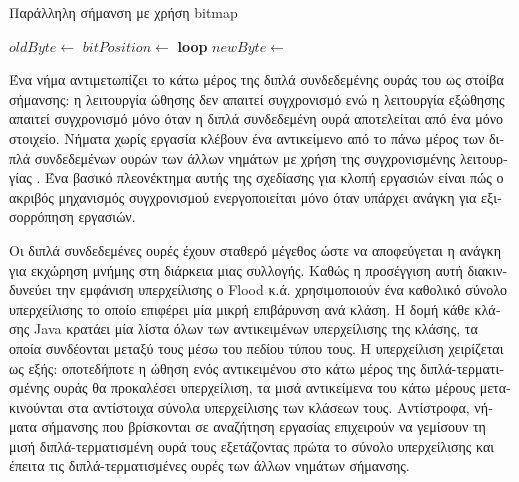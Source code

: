 \begin{greek}
\begin{algorithm}
  \caption{Παράλληλη σήμανση με χρήση bitmap}
  \label{alg:par2}
  \begin{algorithmic}[1]
      \State $oldByte \gets$ 
      \State $bitPosition \gets$ 
      \State \textbf{loop}
      \Loop
          \State \Return{\null}
        \EndIf
        \State $newByte \gets$ 
          \State \Return{\null}
        \EndIf
      \EndLoop
    \EndProcedure
  \end{algorithmic}
\end{algorithm}

Ένα νήμα αντιμετωπίζει το κάτω μέρος της διπλά συνδεδεμένης ουράς
του ως στοίβα σήμανσης: η λειτουργία ώθησης δεν απαιτεί συγχρονισμό
ενώ η λειτουργία εξώθησης απαιτεί συγχρονισμό μόνο όταν η διπλά
συνδεδεμένη ουρά αποτελείται από ένα μόνο στοιχείο. Νήματα χωρίς
εργασία κλέβουν ένα αντικείμενο από το πάνω μέρος των διπλά συνδεδεμένων
ουρών των άλλων νημάτων με χρήση της συγχρονισμένης λειτουργίας
. Ένα βασικό πλεονέκτημα αυτής της σχεδίασης
για κλοπή εργασιών είναι πώς ο ακριβός μηχανισμός συγχρονισμού
ενεργοποιείται μόνο όταν υπάρχει ανάγκη για εξισορρόπηση εργασιών.

Οι διπλά συνδεδεμένες ουρές έχουν σταθερό μέγεθος ώστε να αποφεύγεται
η ανάγκη για εκχώρηση μνήμης στη διάρκεια μιας συλλογής. Καθώς
η προσέγγιση αυτή διακινδυνεύει την εμφάνιση υπερχείλισης ο
Flood κ.ά. χρησιμοποιούν ένα καθολικό σύνολο υπερχείλισης το
οποίο επιφέρει μία μικρή επιβάρυνση ανά κλάση. Η δομή κάθε
κλάσης Java κρατάει μία λίστα όλων των αντικειμένων υπερχείλισης
της κλάσης, τα οποία συνδέονται μεταξύ τους μέσω του πεδίου
τύπου τους. Η υπερχείλιση χειρίζεται ως εξής: οποτεδήποτε η
ώθηση ενός αντικειμένου στο κάτω μέρος της διπλά-τερματισμένης
ουράς θα προκαλέσει υπερχείλιση, τα μισά αντικείμενα του κάτω
μέρους μετακινούνται στα αντίστοιχα σύνολα υπερχείλισης των
κλάσεων τους. Αντίστροφα, νήματα σήμανσης που βρίσκονται σε
αναζήτηση εργασίας επιχειρούν να γεμίσουν τη μισή διπλά-τερματισμένη
ουρά τους εξετάζοντας πρώτα το σύνολο υπερχείλισης και έπειτα
τις διπλά-τερματισμένες ουρές των άλλων νημάτων σήμανσης.


\end{greek}
